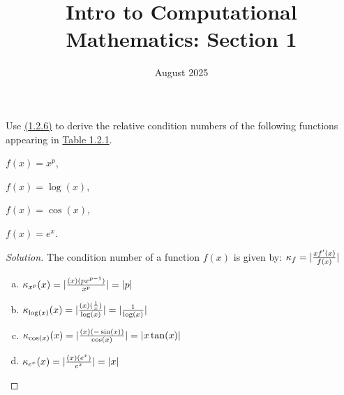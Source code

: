 \documentclass{article}
\title{Intro to Computational Mathematics: Section 1}
\date{August 2025}
\DeclarePairedDelimiter{\abs}{\lvert}{\rvert}
\newenvironment{problem}[2][Problem]{\begin{trivlist}
\item[\hskip \labelsep {\bfseries #1}\hskip \labelsep {\bfseries #2.}]}{\end{trivlist}}
\theoremstyle{definition}
\begin{document}
\maketitle



\begin{problem}{1.2.1}
    Use \href{https://fncbook.com/conditioning/#conditionderiv}{(1.2.6)} to derive the relative condition numbers of the following functions appearing in \href{https://fncbook.com/conditioning/#table-condition-functions}{Table 1.2.1}.

\begin{center}
\begin{enumerate*}[(a),itemjoin=\qquad]
    \item $f(x) = x^p$,
    \item $f(x) = \log(x)$, 
    \item $f(x) = \cos(x)$,
    \item $f(x) = e^x$.
\end{enumerate*}
\end{center}
\end{problem}
\begin{proof}[Solution]
The condition number of a function $f(x)$ is given by: $\kappa_f = \abs{\frac{xf'(x)}{f(x)}}$
\begin{enumerate}[(a)]
    \item $\kappa_{x^p}(x) = \abs{\frac{(x)(px^{p-1})}{x^p}} = \abs{p}$
    \item $\kappa_{\log(x)}(x) = \abs{\frac{(x)(\frac{1}{x})}{\log(x)}} = \abs{\frac{1}{\log(x)}}$
    \item $\kappa_{\cos(x)}(x) = \abs{\frac{(x)(-\sin(x))}{\cos(x)}} = \abs{x\tan(x)}$
    \item $\kappa_{e^x}(x) = \abs{\frac{(x)(e^x)}{e^x}} = \abs{x}$
\end{enumerate}
\end{proof}
\end{document}
